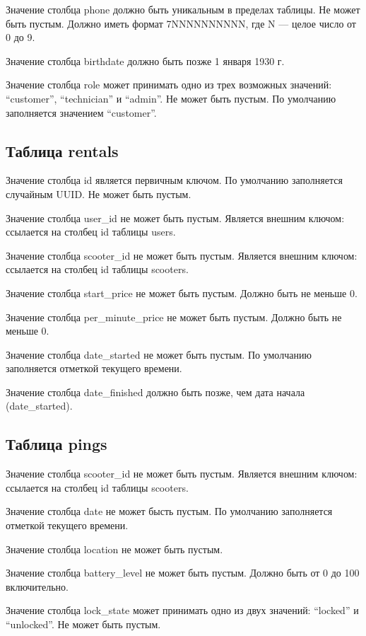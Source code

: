Значение столбца phone должно быть уникальным в пределах таблицы. Не может быть пустым. Должно иметь формат 7NNNNNNNNNN, где N --- целое число от 0 до 9.

Значение столбца birthdate должно быть позже 1 января 1930 г.

Значение столбца role может принимать одно из трех возможных значений: \enquote{customer}, \enquote{technician} и \enquote{admin}. Не может быть пустым. По умолчанию заполняется значением \enquote{customer}.

\subsection{Таблица rentals}

Значение столбца id является первичным ключом. По умолчанию заполняется случайным UUID. Не может быть пустым.

Значение столбца user\_id не может быть пустым. Является внешним ключом: ссылается на столбец id таблицы users.

Значение столбца scooter\_id не может быть пустым. Является внешним ключом: ссылается на столбец id таблицы scooters.

Значение столбца start\_price не может быть пустым. Должно быть не меньше 0.

Значение столбца per\_minute\_price не может быть пустым. Должно быть не меньше 0.

Значение столбца date\_started не может быть пустым. По умолчанию заполняется отметкой текущего времени.

Значение столбца date\_finished должно быть позже, чем дата начала (date\_started).

\subsection{Таблица pings}

Значение столбца scooter\_id не может быть пустым. Является внешним ключом: ссылается на столбец id таблицы scooters.

Значение столбца date не может бысть пустым. По умолчанию заполняется отметкой текущего времени.

Значение столбца location не может быть пустым.

Значение столбца battery\_level не может быть пустым. Должно быть от 0 до 100 включительно.

Значение столбца lock\_state может принимать одно из двух значений: \enquote{locked} и \enquote{unlocked}. Не может быть пустым.

